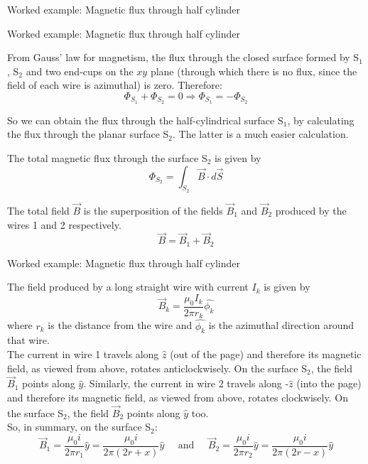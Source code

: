 {\begin{frame}{Worked example: Magnetic flux through half cylinder}
\end{frame}

%
%
%

\begin{frame}{Worked example: Magnetic flux through half cylinder}

  From Gauss' law for magnetism, the flux through the closed surface formed by
  S$_1$, S$_2$ and two end-cups on the $xy$ plane (through which there
  is no flux, since the field of each wire is azimuthal) is zero. Therefore:
  \begin{equation*}
  	 \Phi_{S_1} + \Phi_{S_2} = 0 \Rightarrow \Phi_{S_1} = -\Phi_{S_2}
  \end{equation*}

  So we can obtain the flux through the half-cylindrical surface S$_1$, by calculating the
  flux through the planar surface S$_2$. The latter is a much easier calculation.

  The total magnetic flux through the surface S$_2$ is given by
  \begin{equation*}
  	\Phi_{S_2} = \int_{S_2} \vec{B} \cdot d\vec{S}
  \end{equation*}

  The total field $\vec{B}$ is the superposition of the fields $\vec{B}_1$ and
  $\vec{B}_2$ produced by the wires 1 and 2 respectively.
  \begin{equation*}
  	\vec{B} = \vec{B}_1 + \vec{B}_2
  \end{equation*}

\end{frame}

%
%
%

\begin{frame}{Worked example: Magnetic flux through half cylinder}

  The field produced by a long straight wire with current $I_k$ is given by
  \begin{equation*}
     \vec{B}_{k} = \frac{\mu_0 I_k}{2\pi r_k} \hat{\phi_k}
  \end{equation*}
  where $r_k$ is the distance from the wire and $\hat{\phi_k}$
  is the azimuthal direction around that wire.\\
  \vspace{0.1cm}
  The current in wire 1 travels along $\hat{z}$ (out of the page) and therefore
  its magnetic field, as viewed from above, rotates anticlockwisely.
  On the surface S$_2$, the field $\vec{B}_{1}$ points along $\hat{y}$.
  Similarly,
  the current in wire 2 travels along -$\hat{z}$ (into the page) and therefore
  its magnetic field, as viewed from above, rotates clockwisely.
  On the surface S$_2$, the field $\vec{B}_{2}$ points along $\hat{y}$ too.\\
  \vspace{0.1cm}
  So, in summary, on the surface S$_2$:
  \begin{equation*}
     \vec{B}_{1} = \frac{\mu_0 i}{2\pi r_1} \hat{y} = \frac{\mu_0 i}{2\pi (2r+x)} \hat{y}
     \;\;\;\;\; \text{and} \;\;\;\;\;
     \vec{B}_{2} = \frac{\mu_0 i}{2\pi r_2} \hat{y} = \frac{\mu_0 i}{2\pi (2r-x)} \hat{y}
  \end{equation*}


\end{frame}}
